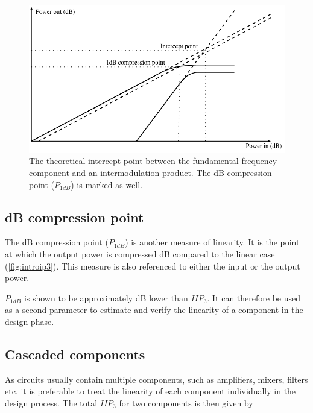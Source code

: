 			\begin{figure}[hbt!]
			\centering
			\includegraphics[width=1\textwidth]{fig/introduction/ip3.pdf}
			\caption[Definition of $n^{th}$-order intercept point and 1 dB compression point.]{The theoretical intercept point between the fundamental frequency component and an intermodulation product. The \unit[1]{dB} compression point ($P_{1dB}$) is marked as well.}\label{fig:introip3}
			\end{figure}

		\subsection{\unit[1]{dB} compression point}\label{sec:p1db}
			The \unit[1]{dB} compression point ($P_{1dB}$) is another measure of linearity. It is the point at which the output power is compressed \unit[1]{dB} compared to the linear case (\autoref{fig:introip3}). This measure is also referenced to either the input or the output power.

			$P_{1dB}$ is shown to be approximately \unit[10]{dB} lower than $IIP_3$.\autocite{kundert02} It can therefore be used as a second parameter to estimate and verify the linearity of a component in the design phase. %

		\subsection{Cascaded components}\label{sec:casc_iip3}
			As circuits usually contain multiple components, such as amplifiers, mixers, filters etc, it is preferable to treat the linearity of each component individually in the design process. The total $IIP_3$ for two components is then given by \autocite{pozar90}

